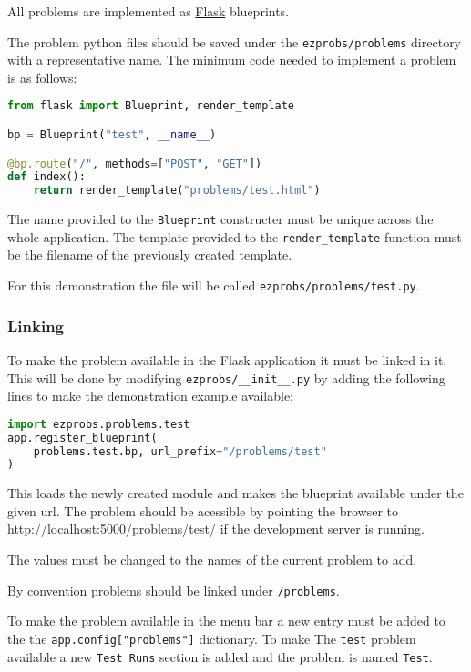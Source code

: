 All problems are implemented as
\href{https://flask.palletsprojects.com/}{Flask} blueprints.

The problem python files should be saved under the \verb+ezprobs/problems+
directory with a representative name. The minimum code needed to implement a
problem is as follows:

\begin{lstlisting}[language=python]
from flask import Blueprint, render_template

bp = Blueprint("test", __name__)

@bp.route("/", methods=["POST", "GET"])
def index():
    return render_template("problems/test.html")
\end{lstlisting}

The name provided to the \verb+Blueprint+ constructer must be unique across the
whole application. The template provided to the \verb+render_template+
function must be the filename of the previously created template.

For this demonstration the file will be called \verb+ezprobs/problems/test.py+.

\subsubsection{Linking}

To make the problem available in the Flask application it must be linked in it.
This will be done by modifying \verb+ezprobs/__init__.py+ by adding the
following lines to make the demonstration example available:

\begin{lstlisting}[language=python]
import ezprobs.problems.test
app.register_blueprint(
    problems.test.bp, url_prefix="/problems/test"
)
\end{lstlisting}

This loads the newly created module and makes the blueprint available under the
given url. The problem should be acessible by pointing the browser to
\href{http://localhost:5000/problems/test/}{http://localhost:5000/problems/test/} if the development server is running.

The values must be changed to the names of the current problem to add.

By convention problems should be linked under \verb+/problems+.

To make the problem available in the menu bar a new entry must be added to the
the \verb+app.config["problems"]+ dictionary. To make The \verb+test+ problem
available a new \verb+Test Runs+ section is added and the problem is named
\verb+Test+.

